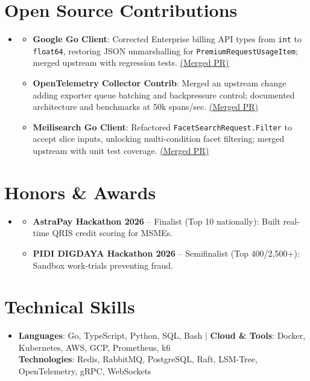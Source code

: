\documentclass[letterpaper,11pt]{article}
\newcommand{\resumeItem}[1]{
  \item\small{
    {#1 \vspace{-2pt}}
  }
}
\newcommand{\resumeSubHeadingListStart}{\begin{itemize}[leftmargin=0.15in, label={}, itemsep=0pt]}
\newcommand{\resumeSubHeadingListEnd}{\end{itemize}\vspace{-8.5pt}}
\newcommand{\resumeItemListStart}{\begin{itemize}[noitemsep, topsep=0pt]}
\newcommand{\resumeItemListEnd}{\end{itemize}\vspace{-4.0pt}}
\begin{document}
\section{Open Source Contributions}
  \resumeSubHeadingListStart
    \vspace{-2pt}\item
      \resumeItemListStart
        \resumeItem{\textbf{Google Go Client}: Corrected Enterprise billing API types from \texttt{int} to \texttt{float64}, restoring JSON unmarshalling for \texttt{PremiumRequestUsageItem}; merged upstream with regression tests. \href{https://github.com/google/go-github/pull/4002}{\underline{(Merged PR)}}}
        \resumeItem{\textbf{OpenTelemetry Collector Contrib}: Merged an upstream change adding exporter queue batching and backpressure control; documented architecture and benchmarks at 50k spans/sec. \href{https://github.com/open-telemetry/opentelemetry-collector-contrib/pull/45819}{\underline{(Merged PR)}}}
        \resumeItem{\textbf{Meilisearch Go Client}: Refactored \texttt{FacetSearchRequest.Filter} to accept slice inputs, unlocking multi-condition facet filtering; merged upstream with unit test coverage. \href{https://github.com/meilisearch/meilisearch-go/pull/753}{\underline{(Merged PR)}}}
      \resumeItemListEnd
  \resumeSubHeadingListEnd

\section{Honors \& Awards}
  \resumeSubHeadingListStart
    \vspace{-2pt}\item
      \resumeItemListStart
        \resumeItem{\textbf{AstraPay Hackathon 2026} -- Finalist (Top 10 nationally): Built real-time QRIS credit scoring for MSMEs.}
        \resumeItem{\textbf{PIDI DIGDAYA Hackathon 2026} -- Semifinalist (Top 400/2,500+): Sandbox work-trials preventing fraud.}
      \resumeItemListEnd
  \resumeSubHeadingListEnd

\section{Technical Skills}
 \resumeSubHeadingListStart
    \vspace{-2pt}\item
    \small{
     \textbf{Languages}{: Go, TypeScript, Python, SQL, Bash} $|$ \textbf{Cloud \& Tools}{: Docker, Kubernetes, AWS, GCP, Prometheus, k6} \\
     \textbf{Technologies}{: Redis, RabbitMQ, PostgreSQL, Raft, LSM-Tree, OpenTelemetry, gRPC, WebSockets}
    }
 \resumeSubHeadingListEnd

\end{document}
